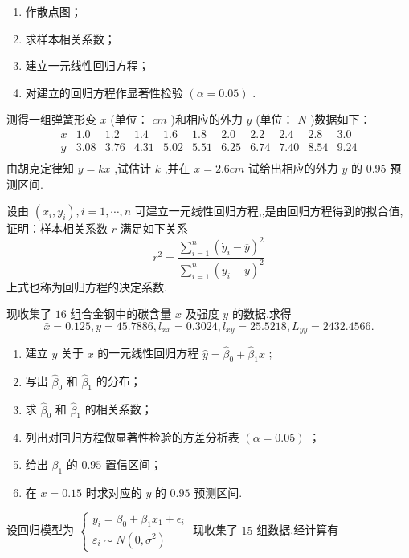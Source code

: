 \begin{xiti}
\[	\]
	\begin{enumerate}
		\item 作散点图；
		\item 求样本相关系数；
		\item 建立一元线性回归方程；
		\item 对建立的回归方程作显著性检验 $ (\alpha=0.05) $ .
	\end{enumerate}
	\item 测得一组弹簧形变 $ x $ (单位： $ cm $ )和相应的外力 $ y $ (单位： $ N $ )数据如下：%
	\[
	\begin{array}{c|cccccccccc}
	x     & 1.0   & 1.2   & 1.4   & 1.6   & 1.8   & 2.0   & 2.2   & 2.4   & 2.8   & 3.0  \\\hline
	y     & 3.08  & 3.76  & 4.31  & 5.02  & 5.51  & 6.25  & 6.74  & 7.40  & 8.54  & 9.24  \\
	\end{array}%
	\]
	由胡克定律知 $ y=kx $ ,试估计 $ k $ ,并在 $ x=2.6cm $ 试给出相应的外力 $ y $ 的 $ 0.95 $ 预测区间.
	\item 设由 $ (x_i,y_i),i=1,\cdots,n $ 可建立一元线性回归方程,,是由回归方程得到的拟合值,证明：样本相关系数 $ r $ 满足如下关系
	\[
	r^{2}=\frac{\sum_{i=1}^{n}\left(\dot{y}_{i}-\overline{y}\right)^{2}}{\sum_{i=1}^{n}\left(y_{i}-\overline{y}\right)^{2}}
	\]
	上式也称为回归方程的决定系数.
	\item 现收集了 $ 16 $ 组合金钢中的碳含量 $ x $ 及强度 $ y $ 的数据,求得
	\[
	\bar{x}=0.125,y=45.7886,l_{xx}=0.3024,l_{xy}=25.5218,L_{yy}=2432.4566.
	\]
	\begin{enumerate}
		\item  建立 $ y $ 关于 $ x $ 的一元线性回归方程 $ \hat{y}=\hat{\beta}_0+\hat{\beta}_1x	$ ;
		\item 写出 $ \hat{\beta}_0 $ 和 $ \hat{\beta}_1 $ 的分布；
		\item 求 $ \hat{\beta}_0 $ 和 $ \hat{\beta}_1 $ 的相关系数；
		\item 列出对回归方程做显著性检验的方差分析表 $ (\alpha=0.05) $ ；
		\item 给出 $ \beta_1 $ 的 $ 0.95 $ 置信区间；
		\item 在 $ x=0.15 $ 时求对应的 $ y $ 的 $ 0.95 $ 预测区间.
	\end{enumerate}
	\item 设回归模型为 $\left\{\begin{array}{l}{y_{i}=\beta_{0}+\beta_{1} x_{1}+\epsilon_{i}} \\ {\varepsilon_{i} \sim N\left(0, \sigma^{2}\right)}\end{array}\right.$ 现收集了 $ 15 $ 组数据,经计算有

\end{xiti}
